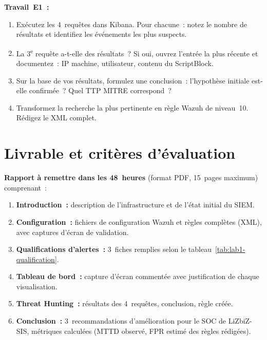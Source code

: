 \begin{boxexo}
\textbf{Travail~E1~:}
\begin{enumerate}
  \item Exécutez les 4~requêtes dans Kibana. Pour chacune~:
        notez le nombre de résultats et identifiez les événements
        les plus suspects.
  \item La 3\textsuperscript{e} requête a-t-elle des résultats~?
        Si oui, ouvrez l'entrée la plus récente et documentez~:
        IP machine, utilisateur, contenu du ScriptBlock.
  \item Sur la base de vos résultats, formulez une conclusion~:
        l'hypothèse initiale est-elle confirmée~? Quel TTP
        MITRE correspond~?
  \item Transformez la recherche la plus pertinente en règle Wazuh
        de niveau~10. Rédigez le XML complet.
\end{enumerate}
\end{boxexo}


\section{Livrable et critères d'évaluation}
\label{lab1:livrable}

\textbf{Rapport à remettre dans les 48~heures} (format PDF, 15~pages
maximum) comprenant~:

\begin{enumerate}
  \item \textbf{Introduction~:} description de l'infrastructure et de
        l'état initial du SIEM.
  \item \textbf{Configuration~:} fichiers de configuration Wazuh
        et règles complètes (XML), avec captures d'écran de validation.
  \item \textbf{Qualifications d'alertes~:} 3~fiches remplies selon
        le tableau~\ref{tab:lab1-qualification}.
  \item \textbf{Tableau de bord~:} capture d'écran commentée avec
        justification de chaque visualisation.
  \item \textbf{Threat Hunting~:} résultats des 4~requêtes, conclusion,
        règle créée.
  \item \textbf{Conclusion~:} 3~recommandations d'amélioration pour le
        SOC de LiZbiZ-SIS, métriques calculées (MTTD observé, FPR
        estimé des règles rédigées).
\end{enumerate}

